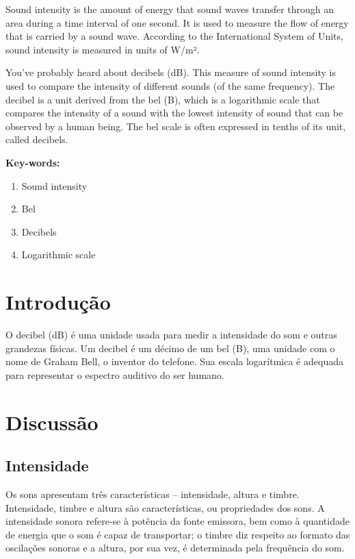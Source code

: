 \documentclass[
	article,		
	11pt,			
	oneside,		
	a4paper,			
	english,			
	brazil			
]{abntex2}
\begin{document}
\renewcommand{\resumoname}{Abstract}
\begin{resumoumacoluna}
Sound intensity is the amount of energy that sound waves transfer through an area during a time interval of one second. It is used to measure the flow of energy that is carried by a sound wave. According to the International System of Units, sound intensity is measured in units of W/m².

You've probably heard about decibels (dB). This measure of sound intensity is used to compare the intensity of different sounds (of the same frequency). The decibel is a unit derived from the bel (B), which is a logarithmic scale that compares the intensity of a sound with the lowest intensity of sound that can be observed by a human being. The bel scale is often expressed in tenths of its unit, called decibels.\cite{HELERBROCKIntensidadeSomBrasilEscola}

\vspace{\onelineskip}
\noindent
\textbf{Key-words:}
\begin{enumerate}
    \item Sound intensity 
    \item Bel
    \item Decibels
    \item Logarithmic scale
\end{enumerate}
\end{resumoumacoluna}

\textual

\section{Introdução}

O decibel (dB) é uma unidade usada para medir a intensidade do som e outras grandezas físicas. Um decibel é um décimo de um bel (B), uma unidade com o nome de Graham Bell, o inventor do telefone. Sua escala logarítmica é adequada para representar o espectro auditivo do ser humano.

\section{Discussão}

\subsection{Intensidade}
Os sons apresentam três características – intensidade, altura e timbre. Intensidade, timbre e altura são características, ou propriedades dos sons. A intensidade sonora refere-se à potência da fonte emissora, bem como à quantidade de energia que o som é capaz de transportar; o timbre diz respeito ao formato das oscilações sonoras e a altura, por sua vez, é determinada pela frequência do som.
\end{document}

